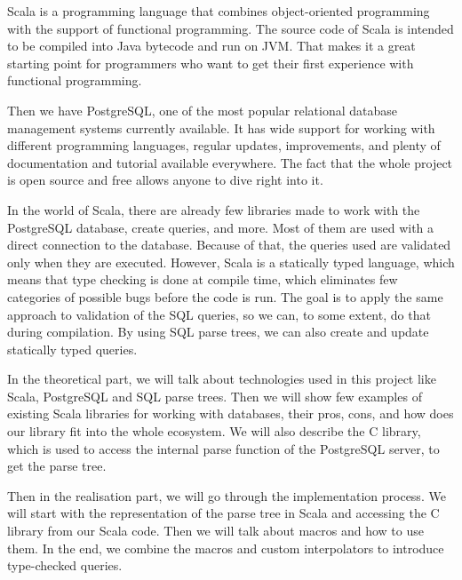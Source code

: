Scala is a programming language that combines object-oriented programming with the support of functional programming. The source code of Scala is intended to be compiled into Java bytecode and run on JVM. That makes it a great starting point for programmers who want to get their first experience with functional programming. 

Then we have PostgreSQL, one of the most popular relational database management systems currently available. It has wide support for working with different programming languages, regular updates, improvements, and plenty of documentation and tutorial available everywhere. The fact that the whole project is open source and free allows anyone to dive right into it.

In the world of Scala, there are already few libraries made to work with the PostgreSQL database, create queries, and more. Most of them are used with a direct connection to the database. Because of that, the queries used are validated only when they are executed. However, Scala is a statically typed language, which means that type checking is done at compile time, which eliminates few categories of possible bugs before the code is run. The goal is to apply the same approach to validation of the SQL queries, so we can, to some extent, do that during compilation. By using SQL parse trees, we can also create and update statically typed queries.

In the theoretical part, we will talk about technologies used in this project like Scala, PostgreSQL and SQL parse trees. Then we will show few examples of existing Scala libraries for working with databases, their pros, cons, and how does our library fit into the whole ecosystem. We will also describe the C library, which is used to access the internal parse function of the PostgreSQL server, to get the parse tree.

Then in the realisation part, we will go through the implementation process. We will start with the representation of the parse tree in Scala and accessing the C library from our Scala code. Then we will talk about macros and how to use them. In the end, we combine the macros and custom interpolators to introduce type-checked queries. 
